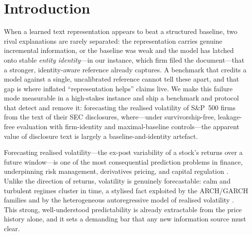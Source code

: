 \section{Introduction}
\label{sec:intro}

When a learned text representation appears to beat a structured baseline, two rival explanations are rarely separated: the representation carries genuine incremental information, or the baseline was weak and the model has latched onto stable \emph{entity identity}---in our instance, which firm filed the document---that a stronger, identity-aware reference already captures. A benchmark that credits a model against a single, uncalibrated reference cannot tell these apart, and that gap is where inflated ``representation helps'' claims live. We make this failure mode measurable in a high-stakes instance and ship a benchmark and protocol that detect and remove it: forecasting the realised volatility of S\&P~500 firms from the text of their SEC disclosures, where---under survivorship-free, leakage-free evaluation with firm-identity and maximal-baseline controls---the apparent value of disclosure text is largely a baseline-and-identity artefact.

Forecasting realised volatility---the ex-post variability of a stock's returns over a future window---is one of the most consequential prediction problems in finance, underpinning risk management, derivatives pricing, and capital regulation \citep{poon2003forecasting,andersen2003modeling}. Unlike the direction of returns, volatility is genuinely forecastable: calm and turbulent regimes cluster in time, a stylised fact exploited by the ARCH/GARCH families \citep{engle1982arch,bollerslev1986garch} and by the heterogeneous autoregressive model of realised volatility \citep[HAR-RV;][]{corsi2009har}. This strong, well-understood predictability is already extractable from the price history alone, and it sets a demanding bar that any new information source must clear.

